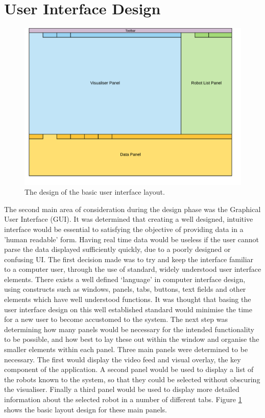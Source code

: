 \section{User Interface Design} \label{UserInterfaceDesign}
\begin{figure}[h]
	\centering
	\includegraphics[scale=1]{Figures/UILayout.png}
	\decoRule
	\caption[UI Layout]{The design of the basic user interface layout.}
	\label{fig:UILayout}
\end{figure}

The second main area of consideration during the design phase was the Graphical User Interface (GUI). It was determined that creating a well designed, intuitive interface would be essential to satisfying the objective of providing data in a 'human readable' form. Having real time data would be useless if the user cannot parse the data displayed sufficiently quickly, due to a poorly designed or confusing UI. The first decision made was to try and keep the interface familiar to a computer user, through the use of standard, widely understood user interface elements. There exists a well defined `language' in computer interface design, using constructs such as windows, panels, tabs, buttons, text fields and other elements which have well understood functions. It was thought that basing the user interface design on this well established standard would minimise the time for a new user to become accustomed to the system. The next step was determining how many panels would be necessary for the intended functionality to be possible, and how best to lay these out within the window and organise the smaller elements within each panel. Three main panels were determined to be necessary. The first would display the video feed and visual overlay, the key component of the application. A second panel would be used to display a list of the robots known to the system, so that they could be selected without obscuring the visualiser. Finally a third panel would be used to display more detailed information about the selected robot in a number of different tabs. Figure \ref{fig:UILayout} shows the basic layout design for these main panels.

